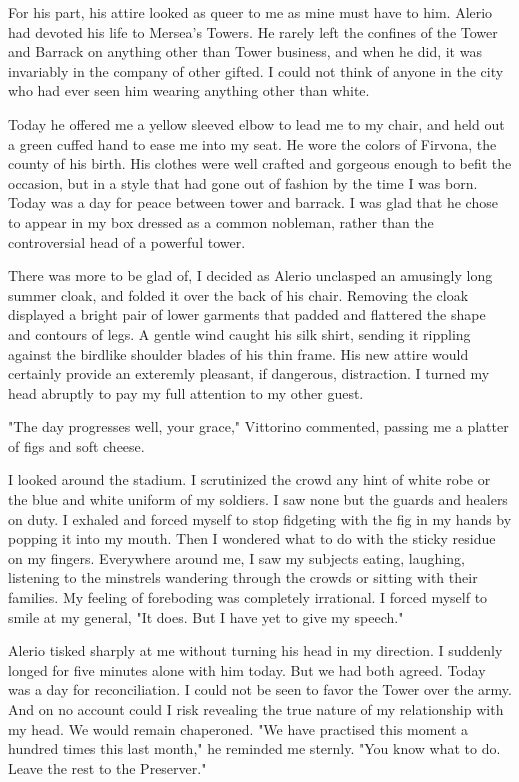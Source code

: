 \documentclass{article}
\begin{document}
For his part, his attire looked as queer to me as mine must have to him. Alerio had devoted his life to Mersea's Towers. He rarely left the confines of the Tower and Barrack on anything other than Tower business, and when he did, it was invariably in the company of other gifted. I could not think of anyone in the city who had ever seen him wearing anything other than white.

Today he offered me a yellow sleeved elbow to lead me to my chair, and held out a green cuffed hand to ease me into my seat. He wore the colors of Firvona, the county of his birth. His clothes were well crafted and gorgeous enough to befit the occasion, but in a style that had gone out of fashion by the time I was born. Today was a day for peace between tower and barrack. I was glad that he chose to appear in my box dressed as a common nobleman, rather than the controversial head of a powerful tower.

There was more to be glad of, I decided as Alerio unclasped an amusingly long summer cloak, and folded it over the back of his chair. Removing the cloak displayed a bright pair of lower garments that padded and flattered the shape and contours of legs. A gentle wind caught his silk shirt, sending it rippling against the birdlike shoulder blades of his thin frame. His new attire would certainly provide an exteremly pleasant, if dangerous, distraction. I turned my head abruptly to pay my full attention to my other guest.

"The day progresses well, your grace," Vittorino commented, passing me a platter of figs and soft cheese.

I looked around the stadium. I scrutinized the crowd any hint of white robe or the blue and white uniform of my soldiers. I saw none but the guards and healers on duty. I exhaled and forced myself to stop fidgeting with the fig in my hands by popping it into my mouth. Then I wondered what to do with the sticky residue on my fingers. Everywhere around me, I saw my subjects eating, laughing, listening to the minstrels wandering through the crowds or sitting with their families. My feeling of foreboding was completely irrational. I forced myself to smile at my general, "It does. But I have yet to give my speech."

Alerio tisked sharply at me without turning his head in my direction. I suddenly longed for five minutes alone with him today. But we had both agreed. Today was a day for reconciliation. I could not be seen to favor the Tower over the army. And on no account could I risk revealing the true nature of my relationship with my head. We would remain chaperoned. "We have practised this moment a hundred times this last month," he reminded me sternly. "You know what to do. Leave the rest to the Preserver."
\end{document}
